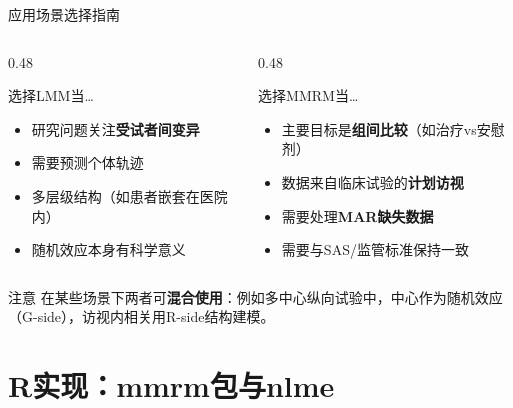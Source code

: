 \documentclass[aspectratio=169,11pt]{beamer}
\begin{document}
\begin{frame}{应用场景选择指南}
\begin{columns}[T,totalwidth=\textwidth]
\begin{column}{0.48\textwidth}
\begin{block}{选择LMM当…}
\begin{itemize}
    \item 研究问题关注\textbf{受试者间变异}
    \item 需要预测个体轨迹
    \item 多层级结构（如患者嵌套在医院内）
    \item 随机效应本身有科学意义
\end{itemize}
\end{block}
\end{column}
\begin{column}{0.48\textwidth}
\begin{block}{选择MMRM当…}
\begin{itemize}
    \item 主要目标是\textbf{组间比较}（如治疗vs安慰剂）
    \item 数据来自临床试验的\textbf{计划访视}
    \item 需要处理\textbf{MAR缺失数据}
    \item 需要与SAS/监管标准保持一致
\end{itemize}
\end{block}
\end{column}
\end{columns}

\vspace{0.2cm}
\begin{alertblock}{注意}
在某些场景下两者可\textbf{混合使用}：例如多中心纵向试验中，中心作为随机效应（G-side），访视内相关用R-side结构建模。
\end{alertblock}
\end{frame}

\section{R实现：mmrm包与nlme}
\end{document}
